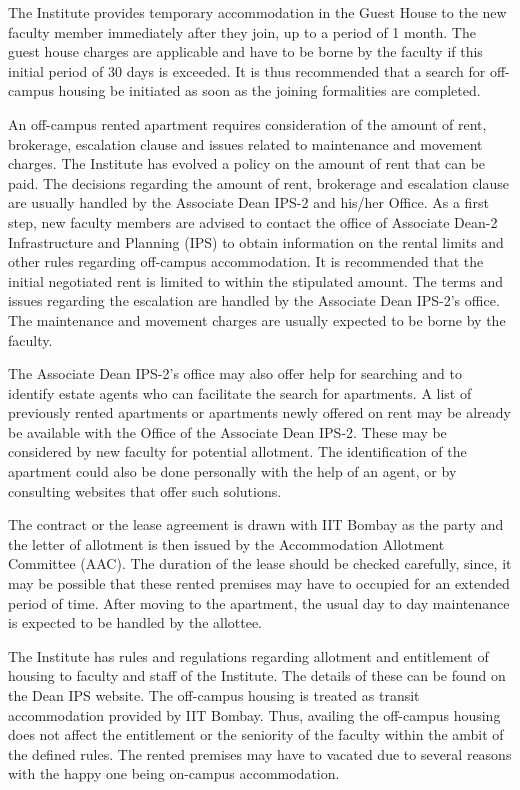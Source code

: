 \documentclass[
  10pt,
  a5paper,
  10pt,
  openany]{amsbook}
\begin{document}
The Institute provides temporary accommodation in the Guest House to the
new faculty member immediately after they join, up to a period of 1
month. The guest house charges are applicable and have to be borne by
the faculty if this initial period of 30 days is exceeded. It is thus
recommended that a search for off-campus housing be initiated as soon as
the joining formalities are completed.

An off-campus rented apartment requires consideration of the amount of
rent, brokerage, escalation clause and issues related to maintenance and
movement charges. The Institute has evolved a policy on the amount of
rent that can be paid. The decisions regarding the amount of rent,
brokerage and escalation clause are usually handled by the Associate
Dean IPS-2 and his/her Office. As a first step, new faculty members are
advised to contact the office of Associate Dean-2 Infrastructure and
Planning (IPS) to obtain information on the rental limits and other
rules regarding off-campus accommodation. It is recommended that the
initial negotiated rent is limited to within the stipulated amount. The
terms and issues regarding the escalation are handled by the Associate
Dean IPS-2's office. The maintenance and movement charges are usually
expected to be borne by the faculty.

The Associate Dean IPS-2's office may also offer help for searching and
to identify estate agents who can facilitate the search for apartments.
A list of previously rented apartments or apartments newly offered on
rent may be already be available with the Office of the Associate Dean
IPS-2. These may be considered by new faculty for potential allotment.
The identification of the apartment could also be done personally with
the help of an agent, or by consulting websites that offer such
solutions.

The contract or the lease agreement is drawn with IIT Bombay as the
party and the letter of allotment is then issued by the Accommodation
Allotment Committee (AAC). The duration of the lease should be checked
carefully, since, it may be possible that these rented premises may have
to occupied for an extended period of time. After moving to the
apartment, the usual day to day maintenance is expected to be handled by
the allottee.

The Institute has rules and regulations regarding allotment and
entitlement of housing to faculty and staff of the Institute. The
details of these can be found on the Dean IPS website. The off-campus
housing is treated as transit accommodation provided by IIT Bombay.
Thus, availing the off-campus housing does not affect the entitlement or
the seniority of the faculty within the ambit of the defined rules. The
rented premises may have to vacated due to several reasons with the
happy one being on-campus accommodation.
\end{document}
